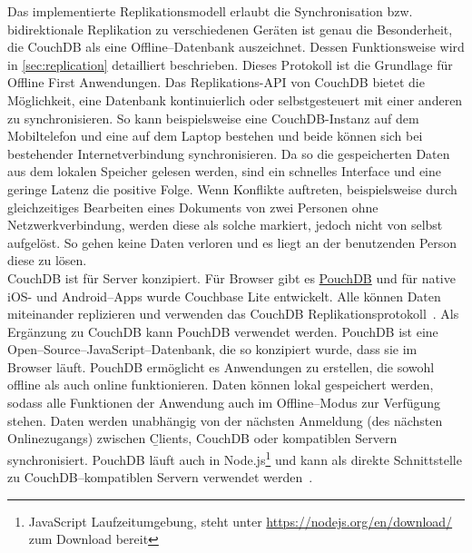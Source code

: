 Das implementierte Replikationsmodell erlaubt die Synchronisation bzw. bidirektionale Replikation zu verschiedenen Geräten ist genau die Besonderheit, die CouchDB als eine Offline--Datenbank auszeichnet. Dessen Funktionsweise wird in \autoref{sec:replication} detailliert beschrieben. Dieses Protokoll ist die Grundlage für Offline First Anwendungen.
Das Replikations-API von CouchDB bietet die Möglichkeit, eine Datenbank kontinuierlich oder selbstgesteuert mit einer anderen zu synchronisieren.
So kann beispielsweise eine CouchDB-Instanz auf dem Mobiltelefon und eine auf dem Laptop bestehen und beide können sich bei bestehender Internetverbindung synchronisieren. Da so die gespeicherten Daten aus dem lokalen Speicher gelesen werden, sind ein schnelles Interface und eine geringe Latenz die positive Folge. Wenn Konflikte auftreten, beispielsweise durch gleichzeitiges Bearbeiten eines Dokuments von zwei Personen ohne Netzwerkverbindung, werden diese als solche markiert, jedoch nicht von selbst aufgelöst. So gehen keine Daten verloren und es liegt an der benutzenden Person diese zu lösen. \\
CouchDB ist für Server konzipiert. Für Browser gibt es \hyperref[sub:pouch]{PouchDB} und für native iOS- und Android--\glspl{App} wurde Couchbase Lite entwickelt. Alle können Daten miteinander replizieren und verwenden das CouchDB Replikationsprotokoll~\cite{couch}.
%
%
Als Ergänzung zu CouchDB kann PouchDB verwendet werden. PouchDB ist eine Open--Source--JavaScript--Datenbank, die so konzipiert wurde, dass sie im Browser läuft. PouchDB ermöglicht es Anwendungen zu erstellen, die sowohl offline als auch online funktionieren. Daten können lokal gespeichert werden, sodass alle Funktionen der Anwendung auch im Offline--Modus zur Verfügung stehen.
Daten werden unabhängig von der nächsten Anmeldung (des nächsten Onlinezugangs) zwischen \b{Clients}, CouchDB oder kompatiblen Servern synchronisiert.
PouchDB läuft auch in Node.js\footnote{JavaScript Laufzeitumgebung, steht unter \url{https://nodejs.org/en/download/} zum Download bereit} und kann als direkte Schnittstelle zu CouchDB--kompatiblen Servern verwendet werden~\cite{pouch}.